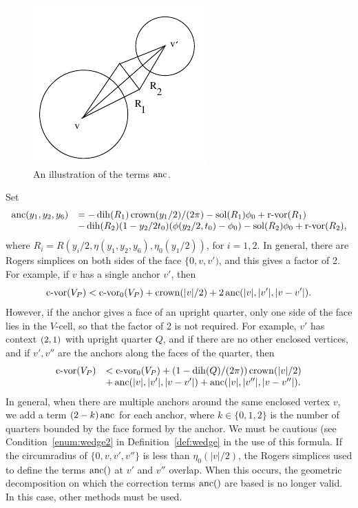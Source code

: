 \begin{figure}[htb]
  \centering
  \includegraphics{PS/diag44.pdf}
  \caption{An illustration of the terms $\operatorname{anc}$.}
  \label{fig:anchor}
\end{figure}


Set
    \begin{equation}
    \begin{array}{lll}
    \operatorname{anc}(y_1,y_2,y_6) &= -\operatorname{dih}(R_1)\operatorname{crown}(y_1/2)/(2\pi)
        -\operatorname{sol}(R_1)\phi_0+{\operatorname{r-vor}}(R_1)\\
    &-\operatorname{dih}(R_2)(1-y_2/2t_0)(\phi(y_2/2,t_0)-\phi_0)
        -\operatorname{sol}(R_2)\phi_0 + {\operatorname{r-vor}}(R_2),
    \label{eqn:4.5}
    \end{array}
    \end{equation}
where $R_i=R(y_i/2,\eta(y_1,y_2,y_6),\eta_0(y_1/2))$, for $i=1,2$.
In general, there are Rogers simplices on both sides of the face
$\{0,v,v')$, and this gives a factor of 2. For example, if $v$ has
a single anchor $v'$, then
$${\operatorname{c-vor}}(V_P) < {\operatorname{c-vor}}_0(V_P) + \operatorname{crown}(|v|/2) + 2\operatorname{anc}(|v|,|v'|,|v-v'|).$$
However, if the anchor gives a face of an upright quarter, only
one side of the face lies in the $V$-cell,
 so that the factor of 2 is not required.
For example, $v'$ has context $\relax(2,1)$ with upright quarter $Q$,
and if there are no other enclosed vertices, and if $v',v''$ are
the anchors along the faces of the quarter,  then
    $$
    \begin{array}{lll}
    {\operatorname{c-vor}}(V_P)&< {\operatorname{c-vor}}_0(V_P) +(1-\operatorname{dih}(Q)/(2\pi))\operatorname{crown}(|v|/2)\\
    &+\operatorname{anc}(|v|,|v'|,|v-v'|)+\operatorname{anc}(|v|,|v''|,|v-v''|).
    \end{array}
    $$
In general, when there are multiple anchors around the same
enclosed vertex $v$, we add a term $(2-k)\operatorname{anc}$ for each anchor,
where $k\in\{0,1,2\}$ is the number of quarters bounded by the
face formed by the anchor. We must be cautious (see
Condition~\ref{enum:wedge2} in Definition~\ref{def:wedge} in the
use of this formula. If the circumradius of $\{0,v,v',v''\}$ is
less than $\eta_0(|v|/2)$, the Rogers simplices used to define the
terms $\operatorname{anc}()$ at $v'$ and $v''$ overlap. When this occurs, the
geometric decomposition on which the correction terms $\operatorname{anc}()$ are
based is no longer valid. In this case, other methods must be
used.

